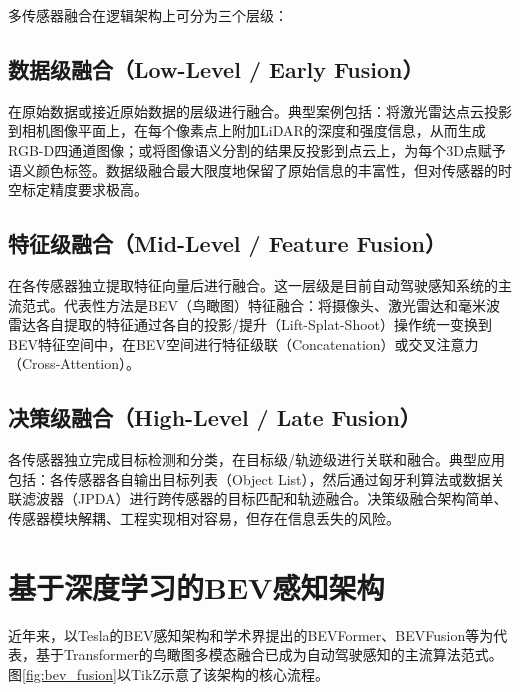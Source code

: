 \documentclass[12pt,a4paper,openany,UTF8]{ctexbook}
\begin{document}
多传感器融合在逻辑架构上可分为三个层级：

\subsection{数据级融合（Low-Level / Early Fusion）}

在原始数据或接近原始数据的层级进行融合。典型案例包括：将激光雷达点云投影到相机图像平面上，在每个像素点上附加LiDAR的深度和强度信息，从而生成RGB-D四通道图像；或将图像语义分割的结果反投影到点云上，为每个3D点赋予语义颜色标签。数据级融合最大限度地保留了原始信息的丰富性，但对传感器的时空标定精度要求极高。

\subsection{特征级融合（Mid-Level / Feature Fusion）}

在各传感器独立提取特征向量后进行融合。这一层级是目前自动驾驶感知系统的主流范式。代表性方法是BEV（鸟瞰图）特征融合：将摄像头、激光雷达和毫米波雷达各自提取的特征通过各自的投影/提升（Lift-Splat-Shoot）操作统一变换到BEV特征空间中，在BEV空间进行特征级联（Concatenation）或交叉注意力（Cross-Attention）。

\subsection{决策级融合（High-Level / Late Fusion）}

各传感器独立完成目标检测和分类，在目标级/轨迹级进行关联和融合。典型应用包括：各传感器各自输出目标列表（Object List），然后通过匈牙利算法或数据关联滤波器（JPDA）进行跨传感器的目标匹配和轨迹融合。决策级融合架构简单、传感器模块解耦、工程实现相对容易，但存在信息丢失的风险。

\section{基于深度学习的BEV感知架构}

近年来，以Tesla的BEV感知架构和学术界提出的BEVFormer、BEVFusion等为代表，基于Transformer的鸟瞰图多模态融合已成为自动驾驶感知的主流算法范式。图\ref{fig:bev_fusion}以TikZ示意了该架构的核心流程。
\end{document}
